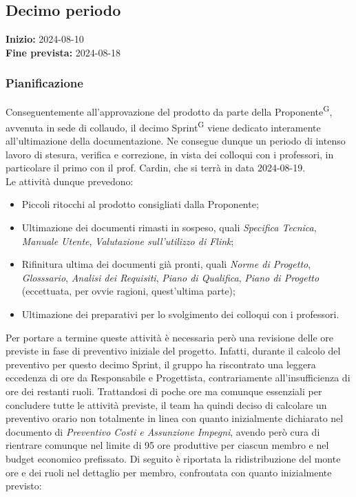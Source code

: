 \documentclass[8pt]{article}
\newcommand{\glossterm}[1]{#1\textsuperscript{G}} %
\begin{document}
\subsection{Decimo periodo}
\textbf{Inizio:} 2024-08-10\\
\textbf{Fine prevista:} 2024-08-18
\subsubsection{Pianificazione}
Conseguentemente all'approvazione del prodotto da parte della \glossterm{Proponente}, avvenuta in sede di collaudo, il decimo \glossterm{Sprint} viene dedicato interamente all'ultimazione della documentazione. Ne consegue dunque un periodo di intenso lavoro di stesura, verifica e correzione, in vista dei colloqui con i professori, in particolare il primo con il prof. Cardin, che si terrà in data 2024-08-19.\\Le attività dunque prevedono:
\begin{itemize}
\setlength\itemsep{0em}
    \item Piccoli ritocchi al prodotto consigliati dalla Proponente;
    \item Ultimazione dei documenti rimasti in sospeso, quali \textit{Specifica Tecnica}, \textit{Manuale Utente}, \textit{Valutazione sull'utilizzo di Flink};
    \item Rifinitura ultima dei documenti già pronti, quali \textit{Norme di Progetto}, \textit{Glosssario}, \textit{Analisi dei Requisiti}, \textit{Piano di Qualifica}, \textit{Piano di Progetto} (eccettuata, per ovvie ragioni, quest'ultima parte);
    \item Ultimazione dei preparativi per lo svolgimento dei colloqui con i professori.
\end{itemize} 
Per portare a termine queste attività è necessaria però una revisione delle ore previste in fase di preventivo iniziale del progetto. Infatti, durante il calcolo del preventivo per questo decimo Sprint, il gruppo ha riscontrato una leggera eccedenza di ore da Responsabile e Progettista, contrariamente all'insufficienza di ore dei restanti ruoli. Trattandosi di poche ore ma comunque essenziali per concludere tutte le attività previste, il team ha quindi deciso di calcolare un preventivo orario non totalmente in linea con quanto inizialmente dichiarato nel documento di \textit{Preventivo Costi e Assunzione Impegni}, avendo però cura di rientrare comunque nel limite di 95 ore produttive per ciascun membro e nel budget economico prefissato. Di seguito è riportata la ridistribuzione del monte ore e dei ruoli nel dettaglio per membro, confrontata con quanto inizialmente previsto:
\end{document}
